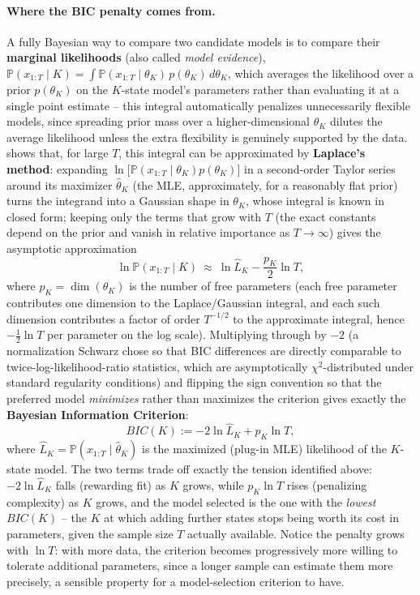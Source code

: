 \documentclass[11pt]{article}
\theoremstyle{definition}
\theoremstyle{remark}
\begin{document}
\paragraph{Where the BIC penalty comes from.} A fully Bayesian way to compare two candidate models is to compare their \textbf{marginal likelihoods} (also called \emph{model evidence}), $\mathbb{P}(x_{1:T}\mid K)=\int \mathbb{P}(x_{1:T}\mid\theta_K)\,p(\theta_K)\,d\theta_K$, which averages the likelihood over a prior $p(\theta_K)$ on the $K$-state model's parameters rather than evaluating it at a single point estimate -- this integral automatically penalizes unnecessarily flexible models, since spreading prior mass over a higher-dimensional $\theta_K$ dilutes the average likelihood unless the extra flexibility is genuinely supported by the data. \cite{schwarz1978} shows that, for large $T$, this integral can be approximated by \textbf{Laplace's method}: expanding $\ln\big[\mathbb{P}(x_{1:T}\mid\theta_K)p(\theta_K)\big]$ in a second-order Taylor series around its maximizer $\widehat\theta_K$ (the MLE, approximately, for a reasonably flat prior) turns the integrand into a Gaussian shape in $\theta_K$, whose integral is known in closed form; keeping only the terms that grow with $T$ (the exact constants depend on the prior and vanish in relative importance as $T\to\infty$) gives the asymptotic approximation
\[
\ln\mathbb{P}(x_{1:T}\mid K) \ \approx\ \ln\widehat{L}_K - \frac{p_K}{2}\ln T,
\]
where $p_K=\dim(\theta_K)$ is the number of free parameters (each free parameter contributes one dimension to the Laplace/Gaussian integral, and each such dimension contributes a factor of order $T^{-1/2}$ to the approximate integral, hence $-\tfrac12\ln T$ per parameter on the log scale). Multiplying through by $-2$ (a normalization Schwarz chose so that BIC differences are directly comparable to twice-log-likelihood-ratio statistics, which are asymptotically $\chi^2$-distributed under standard regularity conditions) and flipping the sign convention so that the preferred model \emph{minimizes} rather than maximizes the criterion gives exactly the \textbf{Bayesian Information Criterion}:
\[
BIC(K) := -2\ln\widehat{L}_K + p_K\ln T,
\]
where $\widehat L_K=\mathbb{P}(x_{1:T}\mid\widehat\theta_K)$ is the maximized (plug-in MLE) likelihood of the $K$-state model. The two terms trade off exactly the tension identified above: $-2\ln\widehat L_K$ falls (rewarding fit) as $K$ grows, while $p_K\ln T$ rises (penalizing complexity) as $K$ grows, and the model selected is the one with the \emph{lowest} $BIC(K)$ -- the $K$ at which adding further states stops being worth its cost in parameters, given the sample size $T$ actually available. Notice the penalty grows with $\ln T$: with more data, the criterion becomes progressively more willing to tolerate additional parameters, since a longer sample can estimate them more precisely, a sensible property for a model-selection criterion to have.
\end{document}
